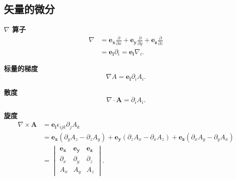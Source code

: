 \subsection{矢量的微分}
\textbf{$\nabla$ 算子}
\begin{equation}
    \begin{aligned}
        \nabla & =\bm{e_x}\frac{\partial}{\partial x}+\bm{e_y}\frac{\partial}{\partial y}+\bm{e_z}\frac{\partial}{\partial z} \\
               & =\bm{e_i}\partial_i=\bm{e_i}\nabla_i.
    \end{aligned}
\end{equation}

\textbf{标量的梯度}
\begin{equation}
    \nabla A=\bm{e_i}\partial_iA_i.
\end{equation}

\textbf{散度}
\begin{equation}
    \nabla\cdot\bm{A}=\partial_iA_i.
\end{equation}

\textbf{旋度}
\begin{equation}
    \begin{aligned}
        \nabla\times\bm{A} & =\bm{e_i}\epsilon_{ijk}\partial_jA_k                                                                               \\
                           & =\bm{e_x}(\partial_yA_z-\partial_zA_y)+\bm{e_y}(\partial_zA_x-\partial_xA_z)+\bm{e_z}(\partial_xA_y-\partial_yA_x) \\
                           & =\begin{vmatrix}
                                  \bm{e_x}   & \bm{e_y}   & \bm{e_z}   \\
                                  \partial_x & \partial_y & \partial_z \\
                                  A_x        & A_y        & A_z
                              \end{vmatrix}.
    \end{aligned}
\end{equation}

